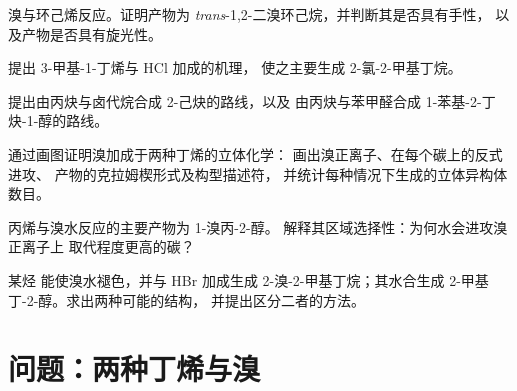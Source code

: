 \begin{exercise}[$\star\star$]\label{exo:b1:electrophilic-additions:7}
溴与环己烯反应。证明产物为
\textit{trans}-1,2-二溴环己烷，并判断其是否具有手性，
以及产物是否具有旋光性。
\end{exercise}

\begin{exercise}[$\star\star$]\label{exo:b1:electrophilic-additions:8}
提出 3-甲基-1-丁烯与 HCl 加成的机理，
使之主要生成 2-氯-2-甲基丁烷。
\end{exercise}

\begin{exercise}[$\star\star$]\label{exo:b1:electrophilic-additions:9}
提出由丙炔与卤代烷合成 2-己炔的路线，以及
由丙炔与苯甲醛合成 1-苯基-2-丁炔-1-醇的路线。
\end{exercise}

\begin{exercise}[$\star\star\star$]\label{exo:b1:electrophilic-additions:10}
通过画图证明溴加成于两种丁烯的立体化学：
画出溴正离子、在每个碳上的反式进攻、
产物的克拉姆楔形式及构型描述符，
并统计每种情况下生成的立体异构体数目。
\end{exercise}

\begin{exercise}[$\star\star\star$]\label{exo:b1:electrophilic-additions:11}
丙烯与溴水反应的主要产物为 1-溴丙-2-醇。
解释其区域选择性：为何水会进攻溴正离子上
取代程度更高的碳？
\end{exercise}

\begin{exercise}[$\star\star\star$]\label{exo:b1:electrophilic-additions:12}
某烃  能使溴水褪色，并与 HBr 加成生成
2-溴-2-甲基丁烷；其水合生成 2-甲基丁-2-醇。求出两种可能的结构，
并提出区分二者的方法。
\end{exercise}

\section{问题：两种丁烯与溴}

